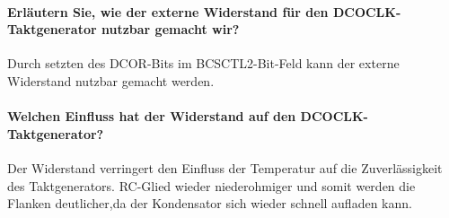 \paragraph{Erläutern Sie, wie der externe Widerstand für den DCOCLK-Taktgenerator nutzbar gemacht wir?}
Durch setzten des DCOR-Bits im BCSCTL2-Bit-Feld kann der externe Widerstand nutzbar gemacht werden.

\paragraph{Welchen Einfluss hat der Widerstand auf den DCOCLK-Taktgenerator?}
Der Widerstand verringert den Einfluss der Temperatur auf die Zuverlässigkeit des Taktgenerators. RC-Glied wieder niederohmiger und somit werden die Flanken deutlicher,da der Kondensator sich wieder schnell aufladen kann.

